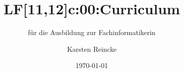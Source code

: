 \documentclass[]{beamer}
\title{LF[11,12]c:00:Curriculum}
\subtitle{für die Ausbildung zur Fachinformatikerin}
\institute[GS-LDK]{Gewerbliche Schulen Dillenburg}
\author{Karsten Reincke}
\date{\today}
\def\cfgGl{../../../cfg.gl/}
\begin{document}

\begin{frame}
  \titlepage

  
\end{frame}



%




\logo{}
\newpage



%
\end{document}
